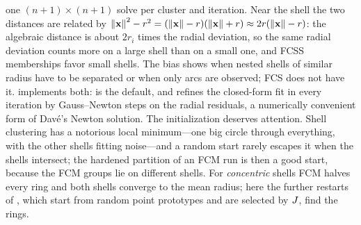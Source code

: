 one $(n+1)\times(n+1)$ solve per cluster and iteration. Near the shell the two distances are related by $\left\lVert \mathbf{x} \right\rVert^2-r^2=(\left\lVert \mathbf{x} \right\rVert-r)(\left\lVert \mathbf{x} \right\rVert+r)\approx2r(\left\lVert \mathbf{x} \right\rVert-r)$: the algebraic distance is about $2r_i$ times the radial deviation, so the same radial deviation counts more on a large shell than on a small one, and FCSS memberships favor small shells. The bias shows when nested shells of similar radius have to be separated or when only arcs are observed; FCS does not have it.  implements both:  is the default, and  refines the closed-form fit in every iteration by  Gauss--Newton steps on the radial residuals, a numerically convenient form of Davé's Newton solution. The initialization deserves attention. Shell clustering has a notorious local minimum---one big circle through everything, with the other shells fitting noise---and a random start rarely escapes it when the shells intersect; the hardened partition of an FCM run is then a good start, because the FCM groups lie on different shells. For \emph{concentric} shells FCM halves every ring and both shells converge to the mean radius; here the further restarts of , which start from random point prototypes and are selected by $J$, find the rings.

